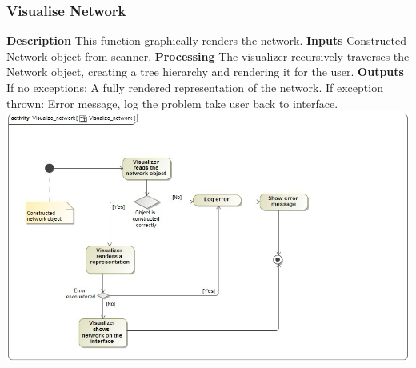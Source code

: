 \documentclass[hidelinks,a4paper,12pt]{article}
\begin{document}
	\subsubsection{Visualise Network}
	\textbf{Description}
	\newline
	This function graphically renders the network.
	\textbf{Inputs}
	\newline
	Constructed Network object from scanner.
	\newline
	\textbf{Processing}
	\newline
The visualizer recursively traverses the Network object, creating a tree hierarchy and rendering it for the user.
	\newline
	\textbf{Outputs}
	\newline
	If no exceptions:
	\newline
	A fully rendered representation of the network.
	\newline
	If exception thrown:
	\newline
	Error message, log the problem take user back to interface.
	\newline
	\includegraphics[width=1.00\textwidth]{./images/Visualise.png}\\[0.4cm] 
	\newpage	
\end{document}

